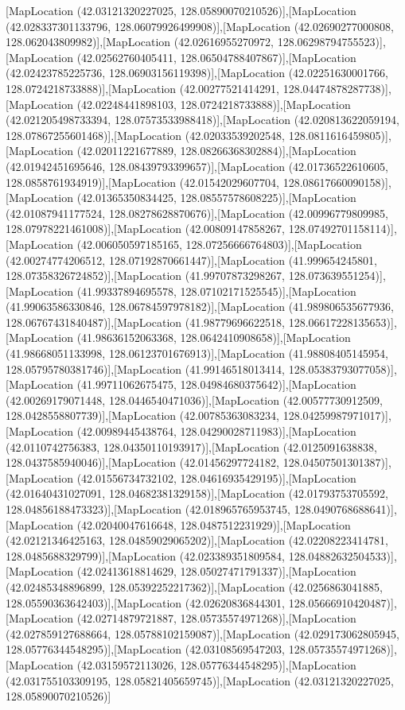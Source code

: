 [MapLocation (42.03121320227025, 128.05890070210526)],[MapLocation (42.028337301133796, 128.06079926499908)],[MapLocation (42.02690277000808, 128.062043809982)],[MapLocation (42.02616955270972, 128.06298794755523)],[MapLocation (42.02562760405411, 128.06504788407867)],[MapLocation (42.02423785225736, 128.06903156119398)],[MapLocation (42.02251630001766, 128.0724218733888)],[MapLocation (42.00277521414291, 128.04474878287738)],[MapLocation (42.02248441898103, 128.0724218733888)],[MapLocation (42.021205498733394, 128.07573533988418)],[MapLocation (42.020813622059194, 128.07867255601468)],[MapLocation (42.02033539202548, 128.0811616459805)],[MapLocation (42.02011221677889, 128.08266368302884)],[MapLocation (42.01942451695646, 128.08439793399657)],[MapLocation (42.01736522610605, 128.0858761934919)],[MapLocation (42.01542029607704, 128.08617660090158)],[MapLocation (42.01365350834425, 128.08557578608225)],[MapLocation (42.01087941177524, 128.08278628870676)],[MapLocation (42.00996779809985, 128.07978221461008)],[MapLocation (42.00809147858267, 128.07492701158114)],[MapLocation (42.006050597185165, 128.07256666764803)],[MapLocation (42.00274774206512, 128.07192870661447)],[MapLocation (41.999654245801, 128.07358326724852)],[MapLocation (41.99707873298267, 128.073639551254)],[MapLocation (41.99337894695578, 128.07102171525545)],[MapLocation (41.99063586330846, 128.06784597978182)],[MapLocation (41.989806535677936, 128.06767431840487)],[MapLocation (41.98779696622518, 128.06617228135653)],[MapLocation (41.98636152063368, 128.0642410908658)],[MapLocation (41.98668051133998, 128.06123701676913)],[MapLocation (41.98808405145954, 128.05795780381746)],[MapLocation (41.99146518013414, 128.05383793077058)],[MapLocation (41.99711062675475, 128.04984680375642)],[MapLocation (42.00269179071448, 128.0446540471036)],[MapLocation (42.00577730912509, 128.0428558807739)],[MapLocation (42.00785363083234, 128.04259987971017)],[MapLocation (42.00989445438764, 128.04290028711983)],[MapLocation (42.0110742756383, 128.04350110193917)],[MapLocation (42.0125091638838, 128.0437585940046)],[MapLocation (42.01456297724182, 128.04507501301387)],[MapLocation (42.01556734732102, 128.04616935429195)],[MapLocation (42.01640431027091, 128.04682381329158)],[MapLocation (42.01793753705592, 128.04856188473323)],[MapLocation (42.018965765953745, 128.0490768688641)],[MapLocation (42.02040047616648, 128.0487512231929)],[MapLocation (42.02121346425163, 128.04859029065202)],[MapLocation (42.02208223414781, 128.0485688329799)],[MapLocation (42.023389351809584, 128.04882632504533)],[MapLocation (42.02413618814629, 128.05027471791337)],[MapLocation (42.02485348896899, 128.05392252217362)],[MapLocation (42.0256863041885, 128.05590363642403)],[MapLocation (42.02620836844301, 128.05666910420487)],[MapLocation (42.02714879721887, 128.05735574971268)],[MapLocation (42.027859127688664, 128.05788102159087)],[MapLocation (42.029173062805945, 128.05776344548295)],[MapLocation (42.03108569547203, 128.05735574971268)],[MapLocation (42.03159572113026, 128.05776344548295)],[MapLocation (42.031755103309195, 128.05821405659745)],[MapLocation (42.03121320227025, 128.05890070210526)]
